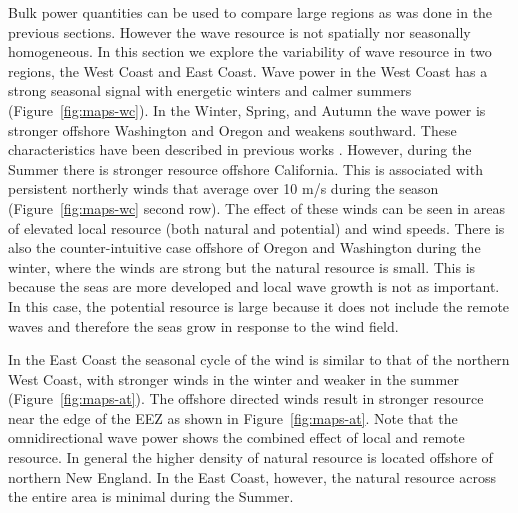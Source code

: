 Bulk power quantities can be used to compare large regions as was done in the previous sections. However the wave resource is not spatially nor seasonally homogeneous. In this section we explore the variability of wave resource in two regions, the West Coast and East Coast. Wave power in the West Coast has a strong seasonal signal with energetic winters and calmer summers (Figure~\ref{fig:maps-wc}). In the Winter, Spring, and Autumn the wave power is stronger offshore Washington and Oregon and weakens southward. These characteristics have been described in previous works \citep[e.g.][]{garcia-medinaWaveResourceAssessment2014,lenee-bluhm_characterizing_2011,yangCharacteristicsVariabilityNearshore2020}. However, during the Summer there is stronger resource offshore California. This is associated with persistent northerly winds that average over 10 m/s during the season (Figure~\ref{fig:maps-wc} second row). The effect of these winds can be seen in areas of elevated local resource (both natural and potential) and wind speeds. There is also the counter-intuitive case offshore of Oregon and Washington during the winter, where the winds are strong but the natural resource is small. This is because the seas are more developed and local wave growth is not as important. In this case, the potential resource is large because it does not include the remote waves and therefore the seas grow in response to the wind field.


In the East Coast the seasonal cycle of the wind is similar to that of the northern West Coast, with stronger winds in the winter and weaker in the summer (Figure~\ref{fig:maps-at}). The offshore directed winds result in stronger resource near the edge of the EEZ as shown in Figure~\ref{fig:maps-at}. Note that the omnidirectional wave power shows the combined effect of local and remote resource. In general the higher density of natural resource is located offshore of northern New England. In the East Coast, however, the natural resource across the entire area is minimal during the Summer.

